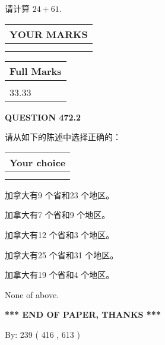 \documentclass{ctexart}
\begin{document}
  
 
请计算 $ %
24 +  %
61 $.
 

 

 
  
\vspace{0.2in}
  
\noindent\begin{tabular}{|l|}
\hline
 YOUR MARKS  \\
\hline
 \\ 
 \\ 
\hline
\end{tabular}
\hspace{0.05in} \begin{tabular}{|l|}
\hline
 Full Marks  \\
\hline
 \\ 
33.33 \\
\hline
\end{tabular}
{\textbf{\Large{QUESTION
472.2 
}}}
  
  
请从如下的陈述中选择正确的：
  
  
\noindent\hspace{3.0in} \begin{tabular}{|l|}
\hline
Your choice \\
\hline
 \\ 
 \\ 
\hline
\end{tabular}
  
  
 
 
加拿大有9 个省和23 个地区。
 
 
加拿大有7 个省和9 个地区。
 
 
加拿大有12 个省和3 个地区。
 
 
加拿大有25 个省和31 个地区。
 
 
加拿大有19 个省和4 个地区。
 
 
 None of above.
 
 
   
   
 \vspace{0.2in}
 
   
   
   
   
\vspace{1.0in} 
{\textbf{\large{ *** END OF PAPER, THANKS *** }}} 
   
   
\hspace{1.0in} By: 
 239 ( 416 ,  613 )
   
\end{document}
